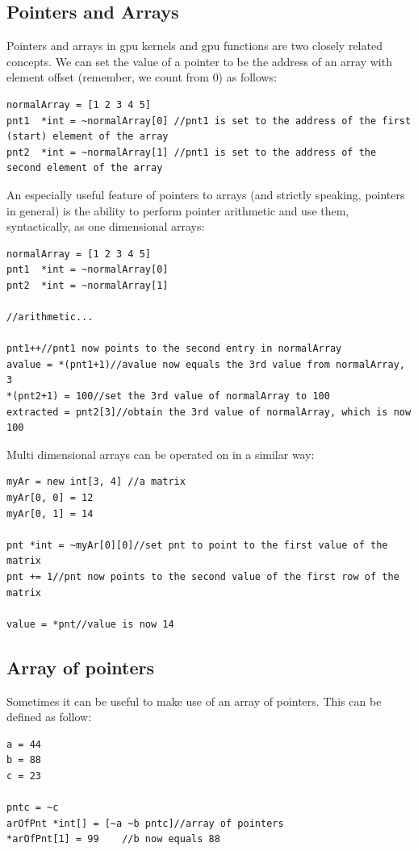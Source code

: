 \documentclass[conc-doc]{subfiles}
\begin{document}
\subsection{Pointers and Arrays}
Pointers and arrays in gpu kernels and gpu functions are two closely related concepts. We can set the value of a pointer to be the address of an array with element offset (remember, we count from 0) as follows:
\begin{lstlisting}
normalArray = [1 2 3 4 5]
pnt1  *int = ~normalArray[0] //pnt1 is set to the address of the first (start) element of the array
pnt2  *int = ~normalArray[1] //pnt1 is set to the address of the second element of the array
\end{lstlisting}

An especially useful feature of pointers to arrays (and strictly speaking, pointers in general) is the ability to perform pointer arithmetic and use them, syntactically, as one dimensional arrays:
\begin{lstlisting}
normalArray = [1 2 3 4 5]
pnt1  *int = ~normalArray[0]
pnt2  *int = ~normalArray[1]

//arithmetic...

pnt1++//pnt1 now points to the second entry in normalArray
avalue = *(pnt1+1)//avalue now equals the 3rd value from normalArray, 3
*(pnt2+1) = 100//set the 3rd value of normalArray to 100
extracted = pnt2[3]//obtain the 3rd value of normalArray, which is now 100
\end{lstlisting}

Multi dimensional arrays can be operated on in a similar way:
\begin{lstlisting}
myAr = new int[3, 4] //a matrix
myAr[0, 0] = 12
myAr[0, 1] = 14

pnt *int = ~myAr[0][0]//set pnt to point to the first value of the matrix
pnt += 1//pnt now points to the second value of the first row of the matrix

value = *pnt//value is now 14
\end{lstlisting}

\subsection{Array of pointers}
Sometimes it can be useful to make use of an array of pointers. This can be defined as follow:
\begin{lstlisting}
a = 44
b = 88
c = 23

pntc = ~c
arOfPnt *int[] = [~a ~b pntc]//array of pointers
*arOfPnt[1] = 99	//b now equals 88
\end{lstlisting}
\end{document}
